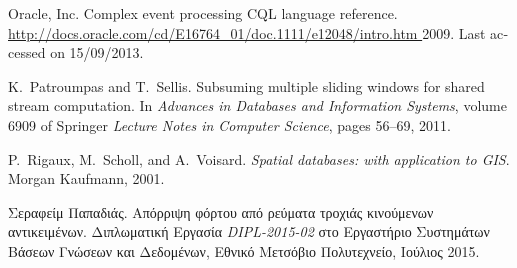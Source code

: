 \begin{thebibliography}{1}
\bibitem{[Ora11]} {\textlatin{
{Oracle, Inc}.
Complex event processing {CQL} language reference.
\url{http://docs.oracle.com/cd/E16764_01/doc.1111/e12048/intro.htm }
  2009. Last accessed on 15/09/2013}}.
  

\bibitem{[PS11]} {\textlatin{
K.~Patroumpas and T.~Sellis.
Subsuming multiple sliding windows for shared stream computation.
In {\em Advances in
  Databases and Information Systems}, volume 6909 of Springer {\em Lecture Notes in
  Computer Science}, pages 56--69, 2011}}.

\bibitem{[RSV02]} {\textlatin{
P.~Rigaux, M.~Scholl, and A.~Voisard.
{\em Spatial databases: with application to {GIS}}.
Morgan Kaufmann, 2001}}.

\bibitem{[Pap15]}
Σεραφείμ Παπαδιάς.
Απόρριψη φόρτου από ρεύματα
  τροχιάς κινούμενων αντικειμένων. Διπλωματική Εργασία {\textlatin{\em DIPL-2015-02}} στο
Εργαστήριο Συστημάτων Βάσεων Γνώσεων και Δεδομένων, Εθνικό Μετσόβιο
  Πολυτεχνείο, Ιούλιος 2015.

\end{thebibliography}